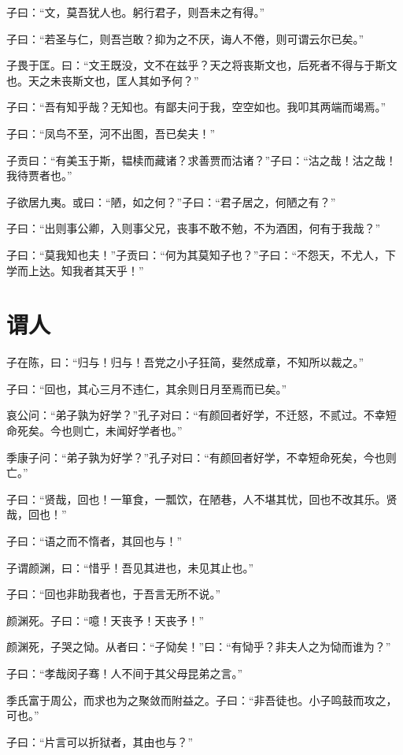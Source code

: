 \documentclass[a5paper]{ctexbook}
\begin{document}
    子曰：“文，莫吾犹人也。躬行君子，则吾未之有得。”

    子曰：“若圣与仁，则吾岂敢？抑为之不厌，诲人不倦，则可谓云尔已矣。”

    子畏于匡。曰：“文王既没，文不在兹乎？天之将丧斯文也，后死者不得与于斯文也。天之未丧斯文也，匡人其如予何？”

    子曰：“吾有知乎哉？无知也。有鄙夫问于我，空空如也。我叩其两端而竭焉。”

    子曰：“凤鸟不至，河不出图，吾已矣夫！”

    子贡曰：“有美玉于斯，韫椟而藏诸？求善贾而沽诸？”子曰：“沽之哉！沽之哉！我待贾者也。”

    子欲居九夷。或曰：“陋，如之何？”子曰：“君子居之，何陋之有？”

    子曰：“出则事公卿，入则事父兄，丧事不敢不勉，不为酒困，何有于我哉？”

    子曰：“莫我知也夫！”子贡曰：“何为其莫知子也？”子曰：“不怨天，不尤人，下学而上达。知我者其天乎！”

    \chapter{谓人}

    子在陈，曰：“归与！归与！吾党之小子狂简，斐然成章，不知所以裁之。”

    子曰：“回也，其心三月不违仁，其余则日月至焉而已矣。”

    哀公问：“弟子孰为好学？”孔子对曰：“有颜回者好学，不迁怒，不贰过。不幸短命死矣。今也则亡，未闻好学者也。”

    季康子问：“弟子孰为好学？”孔子对曰：“有颜回者好学，不幸短命死矣，今也则亡。”

    子曰：“贤哉，回也！一箪食，一瓢饮，在陋巷，人不堪其忧，回也不改其乐。贤哉，回也！”

    子曰：“语之而不惰者，其回也与！”

    子谓颜渊，曰：“惜乎！吾见其进也，未见其止也。”

    子曰：“回也非助我者也，于吾言无所不说。”

    颜渊死。子曰：“噫！天丧予！天丧予！”

    颜渊死，子哭之恸。从者曰：“子恸矣！”曰：“有恸乎？非夫人之为恸而谁为？”

    子曰：“孝哉闵子骞！人不间于其父母昆弟之言。”

    季氏富于周公，而求也为之聚敛而附益之。子曰：“非吾徒也。小子鸣鼓而攻之，可也。”

    子曰：“片言可以折狱者，其由也与？”
\end{document}
